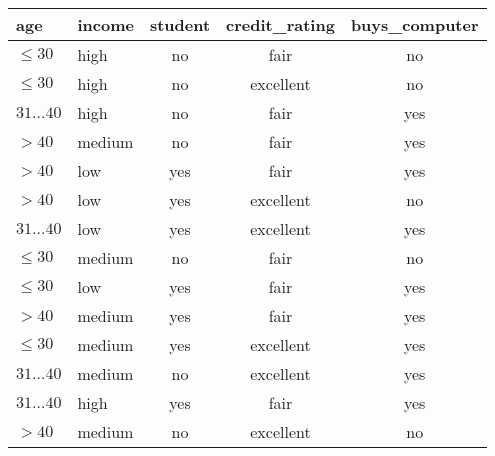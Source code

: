 \begin{tabular}{|l|l|c|c|c|}
	\hline
	\rowcolor{faugray!62}\textbf{age} & \textbf{income} & \textbf{student} & \textbf{credit\_rating} & \textbf{buys\_computer} \\\hline
	$\leq 30$                         & high            & no               & fair                    & {\color{faured}no}      \\\hline
	$\leq 30$                         & high            & no               & excellent               & {\color{faured}no}      \\\hline
	$31\ldots40$                      & high            & no               & fair                    & {\color{faugreen}yes}   \\\hline
	$>40$                             & medium          & no               & fair                    & {\color{faugreen}yes}   \\\hline
	$>40$                             & low             & yes              & fair                    & {\color{faugreen}yes}   \\\hline
	$>40$                             & low             & yes              & excellent               & {\color{faured}no}      \\\hline
	$31\ldots40$                      & low             & yes              & excellent               & {\color{faugreen}yes}   \\\hline
	$\leq 30$                         & medium          & no               & fair                    & {\color{faured}no}      \\\hline
	$\leq 30$                         & low             & yes              & fair                    & {\color{faugreen}yes}   \\\hline
	$>40$                             & medium          & yes              & fair                    & {\color{faugreen}yes}   \\\hline
	$\leq 30$                         & medium          & yes              & excellent               & {\color{faugreen}yes}   \\\hline
	$31\ldots40$                      & medium          & no               & excellent               & {\color{faugreen}yes}   \\\hline
	$31\ldots40$                      & high            & yes              & fair                    & {\color{faugreen}yes}   \\\hline
	$>40$                             & medium          & no               & excellent               & {\color{faured}no}      \\\hline
\end{tabular}
